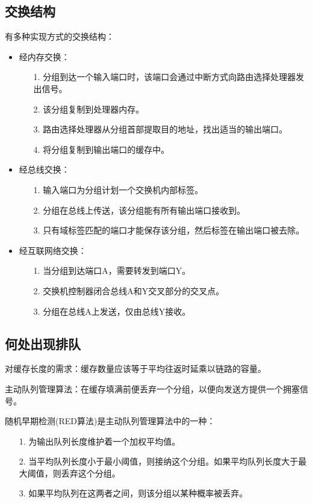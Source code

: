 \documentclass[a4paper,left=2.5cm,right=2.5cm,11pt]{article}
\begin{document}
\subsection{交换结构}
	有多种实现方式的交换结构：
	\begin{itemize}
		\item 经内存交换：
			\begin{itemize}
				\item[1.] 分组到达一个输入端口时，该端口会通过中断方式向路由选择处理器发出信号。
				\item[2.] 该分组复制到处理器内存。
				\item[3.] 路由选择处理器从分组首部提取目的地址，找出适当的输出端口。
				\item[4.] 将分组复制到输出端口的缓存中。
			\end{itemize}
		
		\item 经总线交换：
			\begin{itemize}
				\item[1.] 输入端口为分组计划一个交换机内部标签。
				\item[2.] 分组在总线上传送，该分组能有所有输出端口接收到。
				\item[3.] 只有域标签匹配的端口才能保存该分组，然后标签在输出端口被去除。
			\end{itemize}

		\item 经互联网络交换：
			\begin{itemize}
				\item[1.] 当分组到达端口A，需要转发到端口Y。
				\item[2.] 交换机控制器闭合总线A和Y交叉部分的交叉点。
				\item[3.] 分组在总线A上发送，仅由总线Y接收。
			\end{itemize}
	\end{itemize}

\subsection{何处出现排队}
	对缓存长度的需求：缓存数量应该等于平均往返时延乘以链路的容量。\par

	主动队列管理算法：在缓存填满前便丢弃一个分组，以便向发送方提供一个拥塞信号。\par

	随机早期检测(RED算法)是主动队列管理算法中的一种：
	\begin{itemize}
		\item[1.] 为输出队列长度维护着一个加权平均值。
		\item[2.] 当平均队列长度小于最小阈值，则接纳这个分组。如果平均队列长度大于最大阈值，则丢弃这个分组。
		\item[3.] 如果平均队列在这两者之间，则该分组以某种概率被丢弃。
	\end{itemize}
\end{document}
